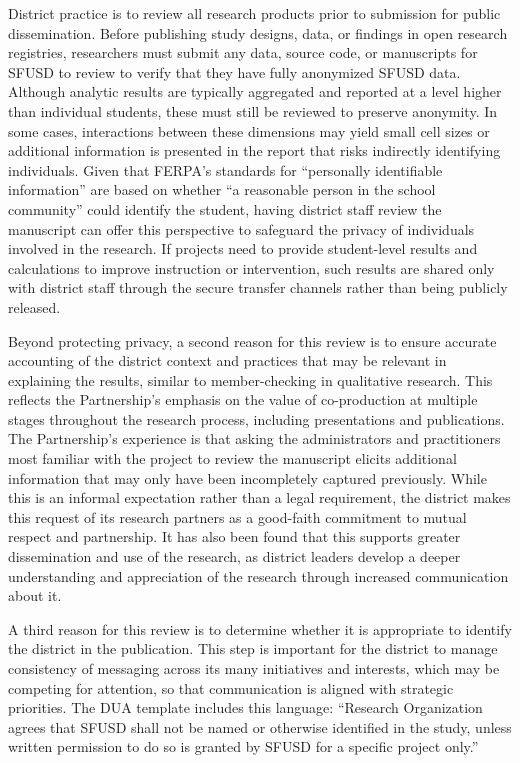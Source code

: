 District practice is to review all research products prior to submission for public dissemination. Before publishing study designs, data, or findings in open research registries, researchers must submit any data, source code, or manuscripts for SFUSD to review to verify that they have fully anonymized SFUSD data. Although analytic results are typically aggregated and reported at a level higher than individual students, these must still be reviewed to preserve anonymity. In some cases, interactions between these dimensions may yield small cell sizes or additional information is presented in the report that risks indirectly identifying individuals. Given that FERPA's standards for ``personally identifiable information'' are based on whether ``a reasonable person in the school community'' could identify the student, having district staff review the manuscript can offer this perspective to safeguard the privacy of individuals involved in the research. If projects need to provide student-level results and calculations to improve instruction or intervention, such results are shared only with district staff through the secure transfer channels rather than being publicly released.

Beyond protecting privacy, a second reason for this review is to ensure accurate accounting of the district context and practices that may be relevant in explaining the results, similar to member-checking in qualitative research. This reflects the Partnership's emphasis on the value of co-production at multiple stages throughout the research process, including presentations and publications. The Partnership's experience is that asking the administrators and practitioners most familiar with the project to review the manuscript elicits additional information that may only have been incompletely captured previously. While this is an informal expectation rather than a legal requirement, the district makes this request of its research partners as a good-faith commitment to mutual respect and partnership. It has also been found that this supports greater dissemination and use of the research, as district leaders develop a deeper understanding and appreciation of the research through increased communication about it.

A third reason for this review is to determine whether it is appropriate to identify the district in the publication. This step is important for the district to manage consistency of messaging across its many initiatives and interests, which may be competing for attention, so that communication is aligned with strategic priorities. The DUA template includes this language: ``Research Organization agrees that SFUSD shall not be named or otherwise identified in the study, unless written permission to do so is granted by SFUSD for a specific project only.''

